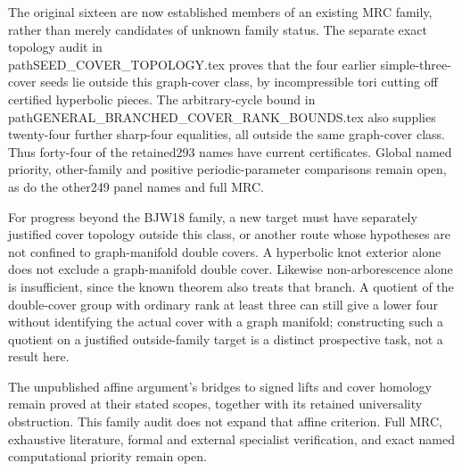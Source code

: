 \documentclass[11pt]{article}
\begin{document}
The original sixteen are now established members of an existing MRC
family, rather than merely candidates of unknown family status.
The separate exact topology audit in \\path{SEED_COVER_TOPOLOGY.tex}
proves that the four earlier simple-three-cover seeds lie outside this
graph-cover class, by incompressible tori cutting off certified hyperbolic
pieces. The arbitrary-cycle bound in
\\path{GENERAL_BRANCHED_COVER_RANK_BOUNDS.tex} also supplies twenty-four
further sharp-four equalities, all outside the same graph-cover class.
Thus forty-four of the retained293 names have current certificates.
Global named priority, other-family and positive periodic-parameter
comparisons remain open, as do the other249 panel names and full MRC.

For progress beyond the BJW18 family, a new target must have separately
justified cover topology outside this class, or another route whose
hypotheses are not confined to graph-manifold double covers. A hyperbolic
knot exterior alone does not exclude a graph-manifold double cover.
Likewise non-arborescence alone is insufficient, since the known theorem
also treats that branch. A quotient of the double-cover group with ordinary
rank at least three can still give a lower four without identifying the actual cover
with a graph manifold; constructing such a quotient on a justified
outside-family target is a distinct prospective task, not a result here.

The unpublished affine argument's bridges to signed lifts and cover
homology remain proved at their stated scopes, together with its retained
universality obstruction. This family audit does not expand that affine
criterion. Full MRC, exhaustive literature, formal and external specialist
verification, and exact named computational priority remain open.
\end{document}
